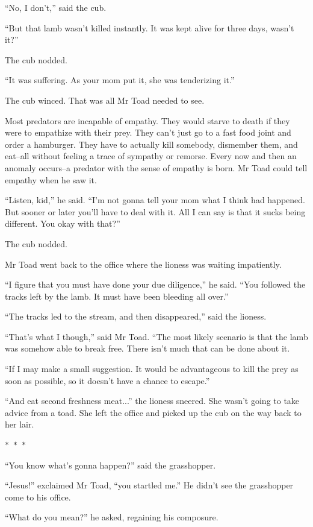 \documentclass{memoir}
\newcommand{\starbreak}{%
\begin{center}
  $\ast$~$\ast$~$\ast$
\end{center}
}
\begin{document}
``No, I don't,'' said the cub.

``But that lamb wasn't killed instantly. It was kept alive for three days, wasn't it?''

The cub nodded.

``It was suffering. As your mom put it, she was tenderizing it.''

The cub winced. That was all Mr Toad needed to see. 

Most predators are incapable of empathy. They would starve to death if they were to empathize with their prey. They can't just go to a fast food joint and order a hamburger. They have to actually kill somebody, dismember them, and eat--all without feeling a trace of sympathy or remorse. Every now and then an anomaly occurs--a predator with the sense of empathy is born. Mr Toad could tell empathy when he saw it.

``Listen, kid,'' he said. ``I'm not gonna tell your mom what I think had happened. But sooner or later you'll have to deal with it. All I can say is that it sucks being different. You okay with that?''

The cub nodded.

Mr Toad went back to the office where the lioness was waiting impatiently.

``I figure that you must have done your due diligence,'' he said. ``You followed the tracks left by the lamb. It must have been bleeding all over.''

``The tracks led to the stream, and then disappeared,'' said the lioness.

``That's what I though,'' said Mr Toad. ``The most likely scenario is that the lamb was somehow able to break free. There isn't much that can be done about it.

``If I may make a small suggestion. It would be advantageous to kill the prey as soon as possible, so it doesn't have a chance to escape.''

``And eat second freshness meat...'' the lioness sneered. She wasn't going to take advice from a toad. She left the office and picked up the cub on the way back to her lair.

\starbreak


``You know what's gonna happen?'' said the grasshopper.

``Jesus!'' exclaimed Mr Toad, ``you startled me.'' He didn't see the grasshopper come to his office.

``What do you mean?'' he asked, regaining his composure.
\end{document}
